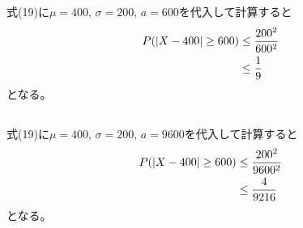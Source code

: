 \documentclass{jsarticle}
\begin{document}
    \subsection{}
    式(19)に$\mu = 400,\, \sigma = 200,\, a=600$を代入して計算すると
    \begin{align}
      P(|X-400| \ge 600) &\le \frac{{200}^2}{600^2} \notag \\
      &\le \frac{1}{9}
    \end{align}
    となる。

    \subsection{}
    式(19)に$\mu = 400,\, \sigma = 200,\, a=9600$を代入して計算すると
    \begin{align}
      P(|X-400| \ge 600) &\le \frac{{200}^2}{9600^2} \notag \\
      &\le \frac{4}{9216}
    \end{align}
    となる。
\end{document}

